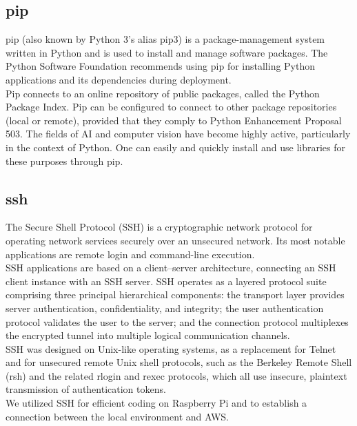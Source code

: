\subsection{\textbf{pip}}
\cite{pip} pip (also known by Python 3's alias pip3) is a package-management system written in Python and is used to install and manage software packages. The Python Software Foundation recommends using pip for installing Python applications and its dependencies during deployment.\\
Pip connects to an online repository of public packages, called the Python Package Index. Pip can be configured to connect to other package repositories (local or remote), provided that they comply to Python Enhancement Proposal 503. The fields of AI and computer vision have become highly active, particularly in the context of Python. One can easily and quickly install and use libraries for these purposes through pip.\\

\subsection{\textbf{ssh}}
\cite{ssh} The Secure Shell Protocol (SSH) is a cryptographic network protocol for operating network services securely over an unsecured network. Its most notable applications are remote login and command-line execution.\\

SSH applications are based on a client–server architecture, connecting an SSH client instance with an SSH server. SSH operates as a layered protocol suite comprising three principal hierarchical components: the transport layer provides server authentication, confidentiality, and integrity; the user authentication protocol validates the user to the server; and the connection protocol multiplexes the encrypted tunnel into multiple logical communication channels.
\\

SSH was designed on Unix-like operating systems, as a replacement for Telnet and for unsecured remote Unix shell protocols, such as the Berkeley Remote Shell (rsh) and the related rlogin and rexec protocols, which all use insecure, plaintext transmission of authentication tokens. \\

We utilized SSH for efficient coding on Raspberry Pi and to establish a connection between the local environment and AWS.\\

